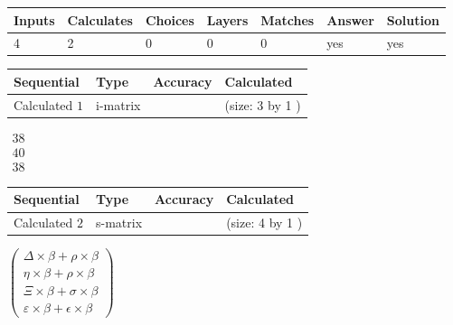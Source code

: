 \documentclass[12pt]{article}
\begin{document}
 
\noindent{}
 
 

 
 
\noindent{}
 
 

 
\vspace{0.3in}
   
   
   
   
\noindent\begin{tabular}{|l|l|l|l|l|l|l|}
 \hline
Inputs & Calculates & Choices & Layers & Matches & Answer & Solution \\ \hline
           4  & 
           2  & 
           0
  & 
           0  & 
           0  & 
  yes & 
  yes 
  \\ \hline
 \end{tabular}
   
   
   
   
\noindent{}
   
   
  
  
\noindent\begin{tabular}{|l|l|l|l|}
\hline
 Sequential & Type & Accuracy & Calculated \\ 
\hline
 
 
  Calculated $            1 $ & i-matrix &  & 
 (size:            3  by            1 )
 \\  \hline  
 \end{tabular}
   
   
$\begin{array}{
 c
 }
          38  \\ 
          40  \\ 
          38
 \end{array}  $ 
  
  
\noindent\begin{tabular}{|l|l|l|l|}
\hline
 Sequential & Type & Accuracy & Calculated \\ 
\hline
 
 
  Calculated $            2 $ & s-matrix & & 
 (size:            4  by            1 )
 \\  \hline  
 \end{tabular}
   
   
 $  \left( \begin{array}
 {
 c
 }
  \Delta \times  \beta +  \rho \times  \beta \\ 
  \eta \times  \beta +  \rho \times  \beta \\ 
                     \Xi \times  \beta +  \sigma \times  \beta \\ 
  \varepsilon \times  \beta +  \epsilon \times  \beta
 \end{array} \right) $ 
   
\end{document}
